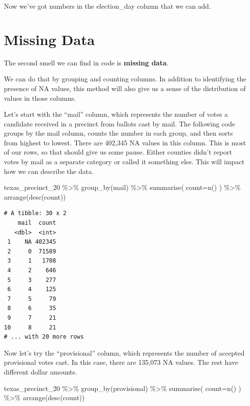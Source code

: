 \documentclass[
  letterpaper,
  DIV=11,
  numbers=noendperiod]{scrreprt}
\newenvironment{Shaded}{\begin{snugshade}}{\end{snugshade}}
\newcommand{\AttributeTok}[1]{\textcolor[rgb]{0.40,0.45,0.13}{#1}}
\newcommand{\FunctionTok}[1]{\textcolor[rgb]{0.28,0.35,0.67}{#1}}
\newcommand{\NormalTok}[1]{\textcolor[rgb]{0.00,0.23,0.31}{#1}}
\newcommand{\SpecialCharTok}[1]{\textcolor[rgb]{0.37,0.37,0.37}{#1}}
\begin{document}
Now we've got numbers in the election\_day column that we can add.

\hypertarget{missing-data}{%
\section{Missing Data}\label{missing-data}}

The second smell we can find in code is \textbf{missing data}.

We can do that by grouping and counting columns. In addition to
identifying the presence of NA values, this method will also give us a
sense of the distribution of values in those columns.

Let's start with the ``mail'' column, which represents the number of
votes a candidate received in a precinct from ballots cast by mail. The
following code groups by the mail column, counts the number in each
group, and then sorts from highest to lowest. There are 402,345 NA
values in this column. This is most of our rows, so that should give us
some pause. Either counties didn't report votes by mail as a separate
category or called it something else. This will impact how we can
describe the data.

\begin{Shaded}
\begin{Highlighting}[]
\NormalTok{texas\_precinct\_20 }\SpecialCharTok{\%\textgreater{}\%}
  \FunctionTok{group\_by}\NormalTok{(mail) }\SpecialCharTok{\%\textgreater{}\%}
  \FunctionTok{summarise}\NormalTok{(}
    \AttributeTok{count=}\FunctionTok{n}\NormalTok{()}
\NormalTok{  ) }\SpecialCharTok{\%\textgreater{}\%}
  \FunctionTok{arrange}\NormalTok{(}\FunctionTok{desc}\NormalTok{(count))}
\end{Highlighting}
\end{Shaded}

\begin{verbatim}
# A tibble: 30 x 2
    mail  count
   <dbl>  <int>
 1    NA 402345
 2     0  71589
 3     1   1708
 4     2    646
 5     3    277
 6     4    125
 7     5     79
 8     6     35
 9     7     21
10     8     21
# ... with 20 more rows
\end{verbatim}

Now let's try the ``provisional'' column, which represents the number of
accepted provisional votes cast. In this case, there are 135,073 NA
values. The rest have different dollar amounts.

\begin{Shaded}
\begin{Highlighting}[]
\NormalTok{texas\_precinct\_20 }\SpecialCharTok{\%\textgreater{}\%}
  \FunctionTok{group\_by}\NormalTok{(provisional) }\SpecialCharTok{\%\textgreater{}\%}
  \FunctionTok{summarise}\NormalTok{(}
    \AttributeTok{count=}\FunctionTok{n}\NormalTok{()}
\NormalTok{  ) }\SpecialCharTok{\%\textgreater{}\%}
  \FunctionTok{arrange}\NormalTok{(}\FunctionTok{desc}\NormalTok{(count))}
\end{Highlighting}
\end{Shaded}
\end{document}
